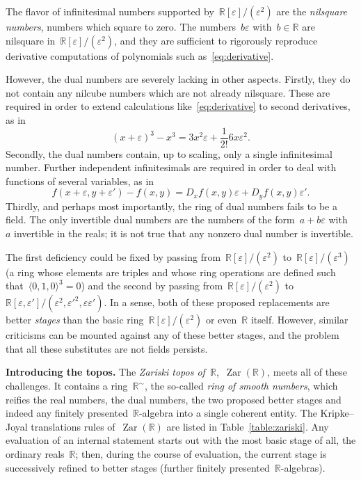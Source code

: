 \documentclass[graybox]{svmult}
\newcommand{\RR}{\mathbb{R}}
\DeclareMathOperator{\Zar}{Zar}
\renewcommand{\_}{\mathpunct{.}\,}
\newcommand{\?}{\,{:}\,}
\renewcommand{\paragraph}[1]{\noindent\textbf{#1.}}
\begin{document}
The flavor of infinitesimal numbers supported
by~$\RR[\varepsilon]/(\varepsilon^2)$ are the \emph{nilsquare numbers}, numbers
which square to zero. The numbers~$b \varepsilon$ with~$b \in \RR$
are nilsquare in~$\RR[\varepsilon]/(\varepsilon^2)$, and
they are sufficient to rigorously reproduce derivative computations of
polynomials such as~\eqref{eq:derivative}.

However, the dual numbers are severely lacking in other aspects. Firstly, they
do not contain any nilcube numbers which are not already nilsquare. These are
required in order to extend calculations like~\eqref{eq:derivative} to second
derivatives, as in
\[ (x+\varepsilon)^3 - x^3 = 3x^2\varepsilon + \frac{1}{2!} 6x
\varepsilon^2. \]
Secondly, the dual numbers contain, up to scaling, only a single infinitesimal
number. Further independent infinitesimals are required in order to deal with
functions of several variables, as in
\[ f(x+\varepsilon,y+\varepsilon') - f(x,y) = D_xf(x,y)\varepsilon +
D_yf(x,y)\varepsilon'. \]
Thirdly, and perhaps most importantly, the ring of dual numbers fails to be a
field. The only invertible dual numbers are the numbers of the form~$a +
b\varepsilon$ with~$a$ invertible in the reals; it is not true that any nonzero
dual number is invertible.

The first deficiency could be fixed by passing
from~$\RR[\varepsilon]/(\varepsilon^2)$ to~$\RR[\varepsilon]/(\varepsilon^3)$
(a ring whose elements are triples and whose ring operations are defined such
that~$\langle0,1,0\rangle^3 = 0$) and the second by passing
from~$\RR[\varepsilon]/(\varepsilon^2)$
to~$\RR[\varepsilon,\varepsilon']/(\varepsilon^2,\varepsilon'^2,\varepsilon\varepsilon')$.
In a sense, both of these proposed replacements are better \emph{stages} than
the basic ring~$\RR[\varepsilon]/(\varepsilon^2)$ or even~$\RR$ itself. However,
similar criticisms can be mounted against any of these better stages, and the
problem that all these substitutes are not fields persists.

\bigskip
\paragraph{Introducing the topos}
The \emph{Zariski topos of~$\RR$},~$\Zar(\RR)$, meets all of these challenges. It
contains a ring~$\RR^\sim$, the so-called \emph{ring of smooth numbers}, which reifies
the real numbers, the dual numbers, the two proposed better stages and indeed
any finitely presented~$\RR$-algebra into a single coherent entity. The
Kripke--Joyal translations rules of~$\Zar(\RR)$ are listed in
Table~\ref{table:zariski}. Any evaluation of an internal statement starts out
with the most basic stage of all, the ordinary reals~$\RR$; then, during the
course of evaluation, the current stage is successively refined to better
stages (further finitely presented~$\RR$-algebras).
\end{document}
